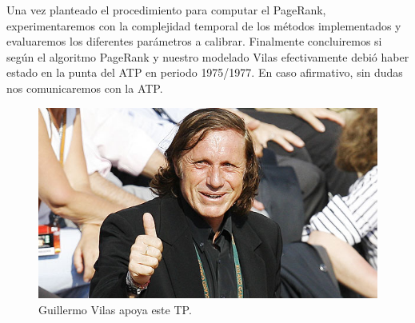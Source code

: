 Una vez planteado el procedimiento para computar el PageRank, experimentaremos con la complejidad temporal de los métodos implementados y evaluaremos los diferentes parámetros a calibrar. Finalmente concluiremos si según el algoritmo PageRank y nuestro modelado Vilas efectivamente debió haber estado en la punta del ATP en periodo 1975/1977. En caso afirmativo, sin dudas nos comunicaremos con la ATP.

\begin{figure}[H]
  \centering
  \includegraphics[scale=0.5]{images/vilasaprueba}
  \caption{Guillermo Vilas apoya este TP.}
\end{figure}